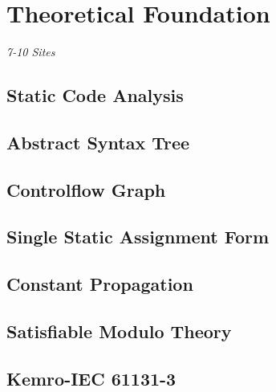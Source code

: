 \chapter {Theoretical Foundation}
\label {cha:theoretical foundation}
\emph{7-10 Sites}

\section{Static Code Analysis}
\section{Abstract Syntax Tree}
\section{Controlflow Graph}
\section{Single Static Assignment Form}
\section{Constant Propagation}
\section{Satisfiable Modulo Theory}
\section{Kemro-IEC 61131-3}

